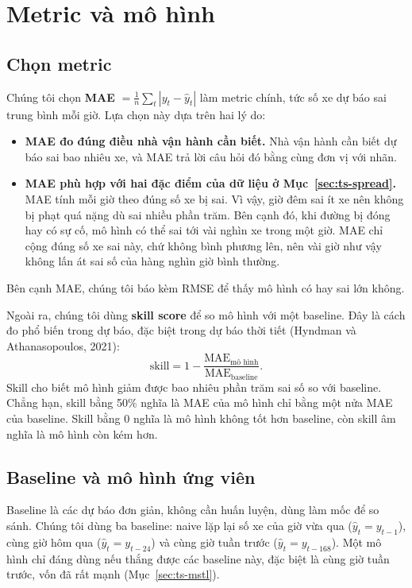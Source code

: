 \section{Metric và mô hình}
\label{sec:ts-models}

\subsection{Chọn metric}
\label{sec:ts-metrics}
Chúng tôi chọn \textbf{MAE} $= \frac{1}{n}\sum_t |y_t - \hat y_t|$ làm metric chính, tức số xe dự báo sai trung bình mỗi giờ. Lựa chọn này
dựa trên hai lý do:
\begin{itemize}[leftmargin=1.5cm]
    \item \textbf{MAE đo đúng điều nhà vận hành cần biết.} Nhà vận hành cần biết dự báo sai bao nhiêu xe, và MAE trả lời câu hỏi đó bằng
          cùng đơn vị với nhãn.
    \item \textbf{MAE phù hợp với hai đặc điểm của dữ liệu ở Mục~\ref{sec:ts-spread}.} MAE tính mỗi giờ theo đúng số xe bị sai. Vì vậy,
          giờ đêm sai ít xe nên không bị phạt quá nặng dù sai nhiều phần trăm. Bên cạnh đó, khi đường bị đóng hay có sự cố, mô hình có thể
          sai tới vài nghìn xe trong một giờ. MAE chỉ cộng đúng số xe sai này, chứ không bình phương lên, nên vài giờ như vậy không lấn át sai
          số của hàng nghìn giờ bình thường.
\end{itemize}
Bên cạnh MAE, chúng tôi báo kèm RMSE để thấy mô hình có hay sai lớn không.

Ngoài ra, chúng tôi dùng \textbf{skill score} để so mô hình với một baseline. Đây là cách đo phổ biến trong dự báo, đặc biệt trong dự báo
thời tiết (Hyndman và Athanasopoulos, 2021):
\[
\text{skill} = 1 - \frac{\text{MAE}_\text{mô hình}}{\text{MAE}_\text{baseline}}.
\]
Skill cho biết mô hình giảm được bao nhiêu phần trăm sai số so với baseline. Chẳng hạn, skill bằng 50\% nghĩa là MAE của mô hình chỉ bằng
một nửa MAE của baseline. Skill bằng 0 nghĩa là mô hình không tốt hơn baseline, còn skill âm nghĩa là mô hình còn kém hơn.

\subsection{Baseline và mô hình ứng viên}
\label{sec:ts-baselines}
Baseline là các dự báo đơn giản, không cần huấn luyện, dùng làm mốc để so sánh. Chúng tôi dùng ba baseline: naive lặp lại số xe của giờ
vừa qua ($\hat y_t = y_{t-1}$), cùng giờ hôm qua ($\hat y_t = y_{t-24}$) và cùng giờ tuần trước ($\hat y_t = y_{t-168}$). Một mô hình chỉ
đáng dùng nếu thắng được các baseline này, đặc biệt là cùng giờ tuần trước, vốn đã rất mạnh (Mục~\ref{sec:ts-mstl}).

